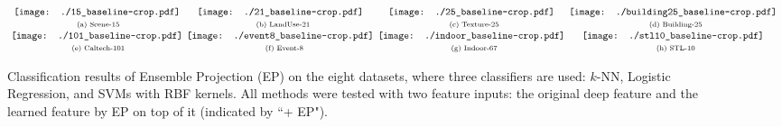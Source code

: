 \documentclass[preprint,12pt,3p]{elsarticle}
\begin{document}
\begin{figure*} 
  \centering
   $ \begin{array}{cccc} \hspace{-1mm}
\texttt{[image: ./15\_baseline-crop.pdf]}& 
\hspace{-2mm}
\texttt{[image: ./21\_baseline-crop.pdf]}& \hspace{-2mm}
\texttt{[image: ./25\_baseline-crop.pdf]}&  \hspace{-2mm}
\texttt{[image: ./building25\_baseline-crop.pdf]}   \\
\scriptsize{\text{(a) Scene-15}} & \scriptsize{\text{(b) LandUse-21}} & \scriptsize{\text{(c) Texture-25}} & \scriptsize{\text{(d) Building-25}}  \\

\hspace{-1mm}
\texttt{[image: ./101\_baseline-crop.pdf]}& \hspace{-2mm}
\texttt{[image: ./event8\_baseline-crop.pdf]}& \hspace{-2mm}
\texttt{[image: ./indoor\_baseline-crop.pdf]}&  \hspace{-2mm}
\texttt{[image: ./stl10\_baseline-crop.pdf]}  \\ 
\scriptsize{\text{(e) Caltech-101}} & \scriptsize{\text{ (f) Event-8}} & \scriptsize{\text{(g) Indoor-67}} & \scriptsize{\text{(h) STL-10}} \\

\end{array}$
 \caption{Classification results of Ensemble Projection (EP) on the
  eight datasets, where three classifiers are used: $k$-NN, Logistic
  Regression, and SVMs with RBF kernels. All methods were tested
  with two feature inputs: the original deep feature and the learned feature by EP on top of it (indicated by ``+ EP"). }
  \label{fig:results:baseline}
\end{figure*}
\end{document}
